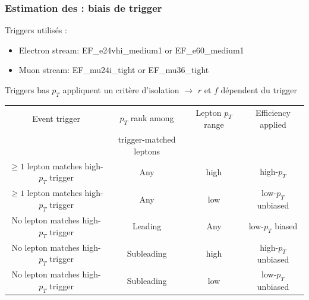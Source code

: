\begin{frame}
\frametitle{Estimation des  : biais de trigger}

\begin{maliste}
\item Triggers utilisés :
\begin{itemize}
\item Electron stream: EF\_e24vhi\_medium1 or EF\_e60\_medium1
\item Muon stream: EF\_mu24i\_tight or EF\_mu36\_tight
\end{itemize} 
\item Triggers bas $p_T$ appliquent un critère d'isolation $\rightarrow$ $r$ et $f$ dépendent du trigger
\end{maliste}

\begin{tiny}
\begin{table}[htb]
  \begin{center}
    \begin{tabular}{cccc}
      \hline\hline
      Event trigger & $p_T$ rank among  &Lepton $p_T$ range  & Efficiency applied \\
                               & trigger-matched leptons &            &     \\ \hline
         $\ge 1$ lepton matches high-$p_T$ trigger & Any & high & high-$p_T$ \\
         $\ge 1$ lepton matches high-$p_T$ trigger & Any & low & low-$p_T$ unbiased \\
          No lepton matches high-$p_T$ trigger &   Leading  & Any & low-$p_T$ biased \\
          No lepton matches high-$p_T$ trigger &   Subleading & high & high-$p_T$ unbiased \\
          No lepton matches high-$p_T$ trigger &   Subleading & low & low-$p_T$ unbiased \\
                 \hline
        \end{tabular}
 \end{center}
\end{table}
\end{tiny}
\end{frame}


